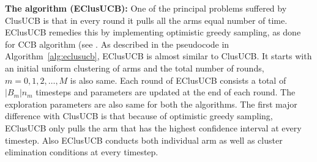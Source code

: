\textbf{The algorithm (EClusUCB):} One of the principal problems suffered by ClusUCB is that in every round it pulls all the arms equal number of time. EClusUCB remedies this by implementing optimistic greedy sampling, as done for CCB algorithm (see \cite{liu2016modification}. As described in the pseudocode in Algorithm~\ref{alg:eclusucb}, EClusUCB is almost similar to ClusUCB. It starts with an initial uniform  clustering of arms and the total number of rounds, $m=0,1,2,\ldots, M$ is also same. Each round of EClusUCB consists a total of $|B_m|n_m$ timesteps and parameters are updated at the end of each round. The exploration parameters are also same for both the algorithms. The first major difference with ClusUCB is that because of optimistic greedy sampling, EClusUCB only pulls the arm that has the highest confidence interval at every timestep. Also EClusUCB conducts both individual arm as well as cluster elimination conditions at every timestep. 

%
%
